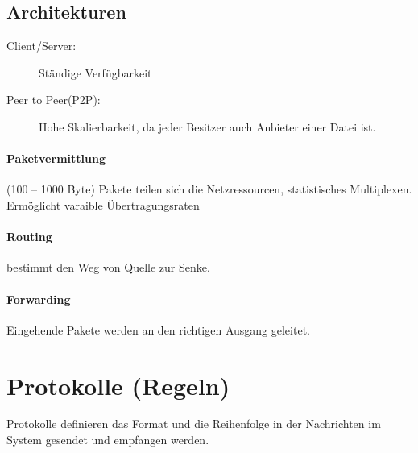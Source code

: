 \documentclass[fs, footer]{latex4ei}
\begin{document}
\begin{multicols*}{4}
{\subsection{Architekturen}
\begin{description}
	\item[Client/Server:] Ständige Verfügbarkeit
	\item[Peer to Peer(P2P):] Hohe Skalierbarkeit, da jeder Besitzer auch Anbieter einer Datei ist.
\end{description}
\paragraph{Paketvermittlung} (100 – 1000 Byte)
Pakete teilen sich die Netzressourcen, statistisches Multiplexen.
Ermöglicht varaible Übertragungsraten
\paragraph{Routing} bestimmt den Weg von Quelle zur Senke.
\paragraph{Forwarding} Eingehende Pakete werden an den richtigen Ausgang geleitet.

}




\vfill
\section{Protokolle (Regeln)}
Protokolle definieren das Format und die Reihenfolge in der Nachrichten im System gesendet und empfangen werden.


\end{multicols*}
\end{document}
